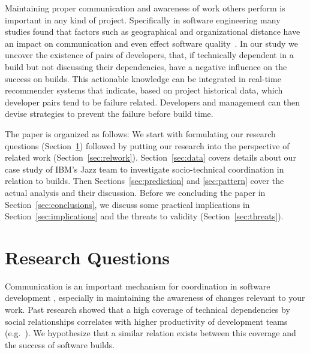 Maintaining proper communication and awareness of work others perform is
important in any kind of project. Specifically in software engineering many studies found
that factors such as geographical and organizational distance have an impact on
communication and even effect software quality~\cite{nagappan:icse:2008}. In our
study we uncover the existence of pairs of
developers, that, if technically dependent in a build but not discussing their
dependencies, have a negative influence on the success on builds. This
actionable knowledge can be integrated in real-time recommender systems that
indicate, based on project historical data, which developer pairs tend to be
failure related. Developers and management can then devise strategies to
prevent the failure before build time. 


The paper is organized as follows: We start with formulating our research
questions (Section~\ref{sec:rq}) followed by putting our research into the
perspective of related work (Section~\ref{sec:relwork}). Section~\ref{sec:data}
covers details about our case study of IBM's Jazz team to investigate
socio-technical coordination in relation to builds. Then
Sections~\ref{sec:prediction} and \ref{sec:pattern} cover the actual analysis and
their discussion. Before we concluding the paper in
Section~\ref{sec:conclusions}, we discuss some practical implications in Section~\ref{sec:implications} and the threats to validity
(Section~\ref{sec:threats}).




\section{Research Questions}
\label{sec:rq}
Communication
is an important mechanism for coordination in software development \cite{curtis:acm:1988,kraut:1995coordination}, especially in maintaining the awareness of changes relevant to your work. Past research showed that a high coverage of technical
dependencies by social relationships correlates with higher productivity of development teams (e.g.~\cite{cataldo:cscw:2006}). 
 We hypothesize that a similar relation
exists between this coverage and the success of software builds. 

